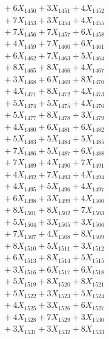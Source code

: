 \documentclass[a4paper,10pt]{article}
\begin{document}
{\begin{align}
&\;  + 6 X_{1450} + 3 X_{1451} + 4 X_{1452} \\[0.3ex]
&\;  + 7 X_{1453} + 3 X_{1454} + 4 X_{1455} \\[0.3ex]
&\;  + 7 X_{1456} + 7 X_{1457} + 6 X_{1458} \\[0.3ex]
&\;  + 4 X_{1459} + 7 X_{1460} + 6 X_{1461} \\[0.3ex]
&\;  + 6 X_{1462} + 7 X_{1463} + 5 X_{1464} \\[0.3ex]
&\;  + 8 X_{1465} + 8 X_{1466} + 4 X_{1467} \\[0.3ex]
&\;  + 3 X_{1468} + 6 X_{1469} + 8 X_{1470} \\[0.3ex]
&\;  + 4 X_{1471} + 8 X_{1472} + 4 X_{1473} \\[0.3ex]
&\;  + 5 X_{1474} + 5 X_{1475} + 4 X_{1476} \\[0.3ex]
&\;  + 5 X_{1477} + 8 X_{1478} + 3 X_{1479} \\[0.5ex]\allowbreak
&\;  + 4 X_{1480} + 6 X_{1481} + 6 X_{1482} \\[0.3ex]
&\;  + 5 X_{1483} + 5 X_{1484} + 5 X_{1485} \\[0.3ex]
&\;  + 7 X_{1486} + 5 X_{1487} + 6 X_{1488} \\[0.3ex]
&\;  + 7 X_{1489} + 4 X_{1490} + 7 X_{1491} \\[0.3ex]
&\;  + 4 X_{1492} + 7 X_{1493} + 4 X_{1494} \\[0.3ex]
&\;  + 4 X_{1495} + 5 X_{1496} + 4 X_{1497} \\[0.3ex]
&\;  + 6 X_{1498} + 3 X_{1499} + 4 X_{1500} \\[0.3ex]
&\;  + 8 X_{1501} + 8 X_{1502} + 7 X_{1503} \\[0.3ex]
&\;  + 5 X_{1504} + 3 X_{1505} + 3 X_{1506} \\[0.3ex]
&\;  + 7 X_{1507} + 4 X_{1508} + 8 X_{1509} \\[0.5ex]\allowbreak
&\;  + 8 X_{1510} + 5 X_{1511} + 3 X_{1512} \\[0.3ex]
&\;  + 6 X_{1513} + 8 X_{1514} + 5 X_{1515} \\[0.3ex]
&\;  + 3 X_{1516} + 6 X_{1517} + 6 X_{1518} \\[0.3ex]
&\;  + 5 X_{1519} + 8 X_{1520} + 8 X_{1521} \\[0.3ex]
&\;  + 5 X_{1522} + 3 X_{1523} + 5 X_{1524} \\[0.3ex]
&\;  + 4 X_{1525} + 3 X_{1526} + 6 X_{1527} \\[0.3ex]
&\;  + 4 X_{1528} + 7 X_{1529} + 3 X_{1530} \\[0.3ex]
&\;  + 3 X_{1531} + 3 X_{1532} + 8 X_{1533} \\[0.3ex]

\end{align}}
\end{document}
